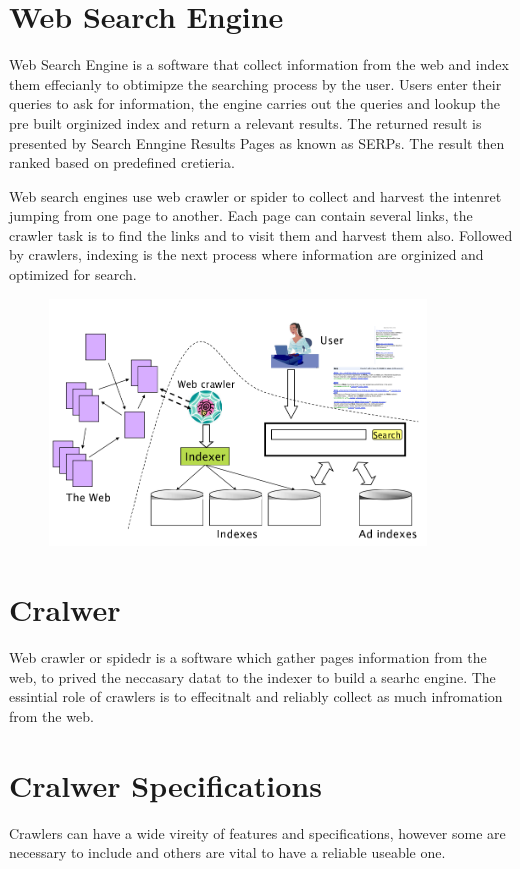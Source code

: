 \section{Web Search Engine}
Web Search Engine is a software that collect information from the web and index them effecianly to obtimipze the searching process by the user. Users enter their queries to ask for information, the engine carries out the queries and lookup the pre built orginized index and return a relevant results. The returned result is presented by Search Enngine Results Pages as known as SERPs. The result then ranked based on predefined cretieria. 

Web search engines use web crawler or spider to collect and harvest the intenret jumping from one page to another. Each page can contain several links, the crawler task is to find the links and to visit them and harvest them also. Followed by crawlers, indexing is the next process where information are orginized and optimized for search. 
\begin{figure}[h]	
     \centering
         \includegraphics[width=10cm]{images/engine_components.png}
\end{figure}

\section{Cralwer}
Web crawler or spidedr is a software which gather pages information from the web, to prived the neccasary datat to the indexer to build a searhc engine. The essintial role of crawlers is to effecitnalt and reliably collect as much infromation from the web. 

\section{Cralwer Specifications}
Crawlers can have a wide vireity of features and specifications, however some are necessary to include and others are vital to have a reliable useable one. 

